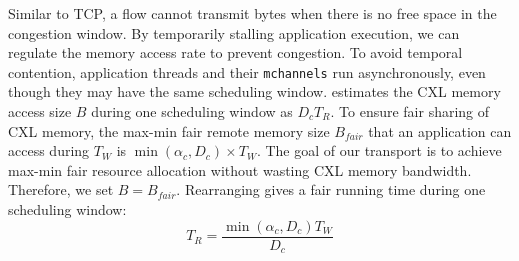 Similar to TCP, a flow cannot transmit bytes when there is no free space in the congestion window. By temporarily stalling application execution, we can regulate the memory access rate to prevent congestion. To avoid temporal contention, application threads and their \texttt{mchannels} run asynchronously, even though they may have the same scheduling window. \sys estimates the CXL memory access size \(B\) during one scheduling window as \(D_c T_R\). To ensure fair sharing of CXL memory, the max-min fair remote memory size \(B_{fair}\) that an application can access during \(T_W\) is \(\min(\alpha_c, D_c) \times T_W\). The goal of our transport is to achieve max-min fair resource allocation without wasting CXL memory bandwidth. Therefore, we set \(B = B_{fair}\). Rearranging gives a fair running time during one scheduling window:
\begin{equation}
\label{eq:time-alloc}
T_R = \frac{\min(\alpha_c, D_c)T_W}{D_c}
\end{equation}


